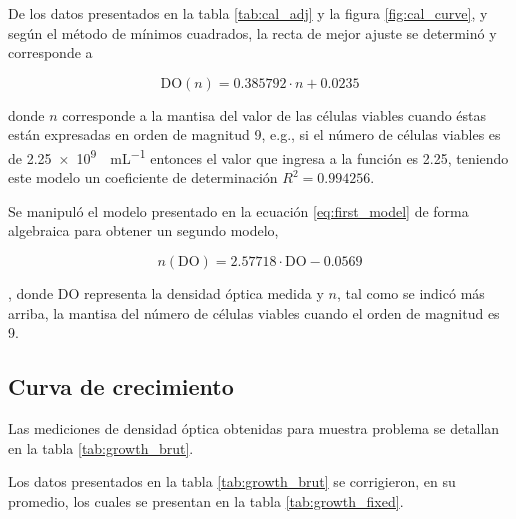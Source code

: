 De los datos presentados en la tabla \ref{tab:cal_adj} y la figura \ref{fig:cal_curve}, y según el método de mínimos cuadrados, la recta de mejor ajuste se determinó y corresponde a 

\begin{equation}
  \text{DO}(n)=0.385792\cdot n + 0.0235
  \label{eq:first_model}
\end{equation}

donde $n$ corresponde a la mantisa del valor de las células viables cuando éstas están expresadas en orden de magnitud 9, e.g., si el número de células viables es de \SI{2.25e9}{\ufc\per\mL} entonces el valor que ingresa a la función es 2.25, teniendo este modelo un coeficiente de determinación $R^2=0.994256$.

Se manipuló el modelo presentado en la ecuación \eqref{eq:first_model} de forma algebraica para obtener un segundo modelo, 

\begin{equation}
  n(\text{DO}) = 2.57718\cdot \text{DO}-0.0569
  \label{eq:actual_model}
\end{equation}

, donde $\text{DO}$ representa la densidad óptica medida y $n$, tal como se indicó más arriba, la mantisa del número de células viables cuando el orden de magnitud es 9.

\subsection{Curva de crecimiento}

Las mediciones de densidad óptica obtenidas para muestra problema se detallan en la tabla \ref{tab:growth_brut}. 

Los datos presentados en la tabla \ref{tab:growth_brut} se corrigieron, en su promedio, los cuales se presentan en la tabla \ref{tab:growth_fixed}.

